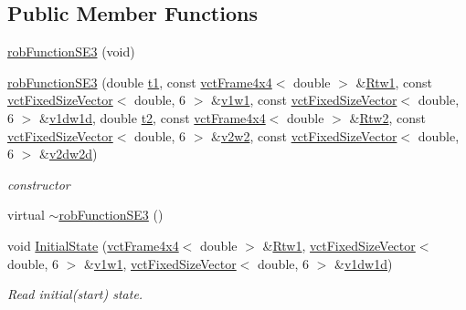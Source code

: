 \subsection*{Public Member Functions}
\begin{DoxyCompactItemize}
\item 
\hyperlink{classrob_function_s_e3_a58865d30da85b8a4aecd3efdbeec7a2e}{rob\-Function\-S\-E3} (void)
\item 
\hyperlink{classrob_function_s_e3_a2e17ff5e098e578d97351da3a416c927}{rob\-Function\-S\-E3} (double \hyperlink{classrob_function_a9a4b408a3a5a8ae927caec3b6bac36ef}{t1}, const \hyperlink{classvct_frame4x4}{vct\-Frame4x4}$<$ double $>$ \&\hyperlink{classrob_function_s_e3_a16c18215d20446f2bd11e7f54ace81a6}{Rtw1}, const \hyperlink{classvct_fixed_size_vector}{vct\-Fixed\-Size\-Vector}$<$ double, 6 $>$ \&\hyperlink{classrob_function_s_e3_a7b1d1ec3899e5c1f95c90fa2b3834e6e}{v1w1}, const \hyperlink{classvct_fixed_size_vector}{vct\-Fixed\-Size\-Vector}$<$ double, 6 $>$ \&\hyperlink{classrob_function_s_e3_a0293adc3a9e5b8bd7f24dded9a70071a}{v1dw1d}, double \hyperlink{classrob_function_abf15c2d695ab4cc6336e19862327858f}{t2}, const \hyperlink{classvct_frame4x4}{vct\-Frame4x4}$<$ double $>$ \&\hyperlink{classrob_function_s_e3_a06d362ebf89c4f6a3984c4097a810a27}{Rtw2}, const \hyperlink{classvct_fixed_size_vector}{vct\-Fixed\-Size\-Vector}$<$ double, 6 $>$ \&\hyperlink{classrob_function_s_e3_a9e6845bf899f02dcab9dc56d59923787}{v2w2}, const \hyperlink{classvct_fixed_size_vector}{vct\-Fixed\-Size\-Vector}$<$ double, 6 $>$ \&\hyperlink{classrob_function_s_e3_ab91a09514cf4b5f4b2626ed8e44133c0}{v2dw2d})
\begin{DoxyCompactList}\small\item\em constructor \end{DoxyCompactList}\item 
virtual \hyperlink{classrob_function_s_e3_a1177738ebad1c25e918b47169ac71ec7}{$\sim$rob\-Function\-S\-E3} ()
\item 
void \hyperlink{classrob_function_s_e3_a28ab7297874b819fda648e928b1b1995}{Initial\-State} (\hyperlink{classvct_frame4x4}{vct\-Frame4x4}$<$ double $>$ \&\hyperlink{classrob_function_s_e3_a16c18215d20446f2bd11e7f54ace81a6}{Rtw1}, \hyperlink{classvct_fixed_size_vector}{vct\-Fixed\-Size\-Vector}$<$ double, 6 $>$ \&\hyperlink{classrob_function_s_e3_a7b1d1ec3899e5c1f95c90fa2b3834e6e}{v1w1}, \hyperlink{classvct_fixed_size_vector}{vct\-Fixed\-Size\-Vector}$<$ double, 6 $>$ \&\hyperlink{classrob_function_s_e3_a0293adc3a9e5b8bd7f24dded9a70071a}{v1dw1d})
\begin{DoxyCompactList}\small\item\em Read initial(start) state. \end{DoxyCompactList}\item 

\end{DoxyCompactItemize}
